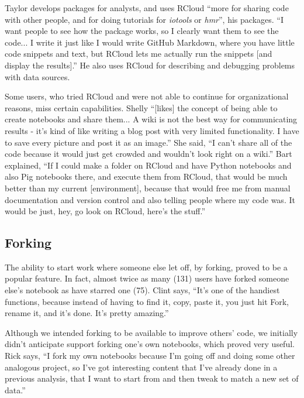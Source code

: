 Taylor develops packages for analysts, and uses RCloud ``more for sharing code with
other people, and for doing tutorials for {\em iotools} or {\em hmr}'', his packages.
``I want people to see how the package works, so I clearly want them
to see the code... I write it just like I would write GitHub
Markdown, where you have little code snippets and text, but RCloud lets me
actually run the snippets [and display the results].'' He also uses RCloud for
describing and debugging  problems with data sources.

Some users, who tried RCloud and were not able to continue for organizational
reasons, miss certain capabilities. Shelly ``[likes] the concept of being
able to create notebooks and share them... A wiki is not the best way for
communicating results - it's kind of like writing a blog post with very limited
functionality. I have to save every picture and post it as an image.'' She said,
``I can't share all of the code because it would just get crowded and wouldn't
look right on a wiki.'' Bart explained, ``If I could make a folder on RCloud and
have Python notebooks and also Pig notebooks there, and execute them from RCloud,
that would be much better than my current [environment], because that would free
me from manual documentation and version control and also telling people where
my code was. It would be just, hey, go look on RCloud, here's the stuff.''



\subsection{Forking}
The ability to start work where someone else let off, by forking, proved to
be a popular feature. In fact, almost twice as many (131) users have forked
someone else's notebook as have starred one (75).  Clint says, ``It's one of the
handiest functions, because instead of having to find it, copy, paste it, you
just hit Fork, rename it, and it's done. It's pretty amazing.''

Although we intended forking to be available to improve others' code, we 
initially didn't anticipate support forking one's own notebooks, which
proved very useful. Rick says, ``I fork my own notebooks because I'm going off
and doing some other analogous project, so I've got interesting content that I've
already done in a previous analysis, that I want to start from and then tweak
to match a new set of data.''


